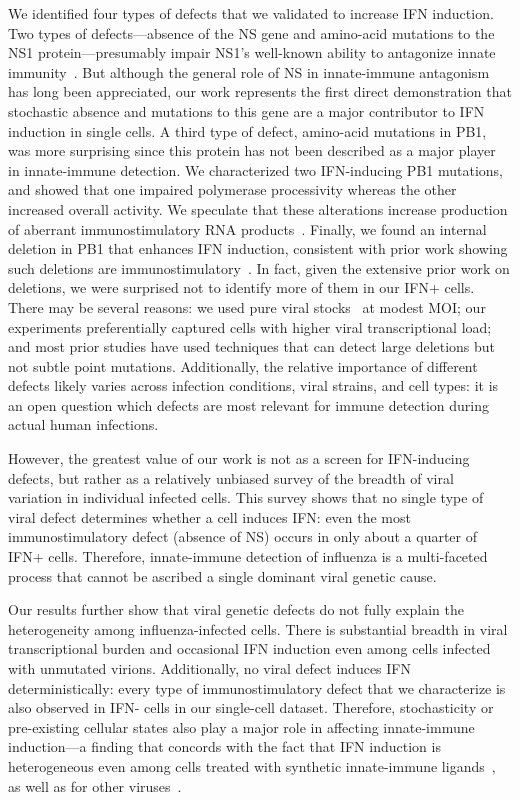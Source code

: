 \documentclass[]{asm-article}
\begin{document}
We identified four types of defects that we validated to increase IFN induction. 
Two types of defects---absence of the NS gene and amino-acid mutations to the NS1 protein---presumably impair NS1's well-known ability to antagonize innate immunity~\cite{garcia1998influenza, hale2008multifunctional}.
But although the general role of NS in innate-immune antagonism has long been appreciated, our work represents the first direct demonstration that stochastic absence and mutations to this gene are a major contributor to IFN induction in single cells.
A third type of defect, amino-acid mutations in PB1, was more surprising since this protein has not been described as a major player in innate-immune detection.
We characterized two IFN-inducing PB1 mutations, and showed that one impaired polymerase processivity whereas the other increased overall activity.
We speculate that these alterations increase production of aberrant immunostimulatory RNA products~\cite{velthuis2018mini}.
Finally, we found an internal deletion in PB1 that enhances IFN induction, consistent with prior work showing such deletions are immunostimulatory~\cite{baum2010preference, tapia2013defective, boergeling2015evidence, dimmock2015cloned, liu2019inhibition}.
In fact, given the extensive prior work on deletions, we were surprised not to identify more of them in our IFN+ cells.
There may be several reasons: we used pure viral stocks~\cite{xue2016propagation} at modest MOI; our experiments preferentially captured cells with higher viral transcriptional load; and most prior studies have used techniques that can detect large deletions but not subtle point mutations.
Additionally, the relative importance of different defects likely varies across infection conditions, viral strains, and cell types: it is an open question which defects are most relevant for immune detection during actual human infections.

However, the greatest value of our work is not as a screen for IFN-inducing defects, but rather as a relatively unbiased survey of the breadth of viral variation in individual infected cells.
This survey shows that no single type of viral defect determines whether a cell induces IFN: even the most immunostimulatory defect (absence of NS) occurs in only about a quarter of IFN+ cells.
Therefore, innate-immune detection of influenza is a multi-faceted process that cannot be ascribed a single dominant viral genetic cause.   

Our results further show that viral genetic defects do not fully explain the heterogeneity among influenza-infected cells.
There is substantial breadth in viral transcriptional burden and occasional IFN induction even among cells infected with unmutated virions.
Additionally, no viral defect induces IFN deterministically: every type of immunostimulatory defect that we characterize is also observed in IFN- cells in our single-cell dataset.
Therefore, stochasticity or pre-existing cellular states also play a major role in affecting innate-immune induction---a finding that concords with the fact that IFN induction is heterogeneous even among cells treated with synthetic innate-immune ligands~\cite{shalek2013single, shalek2014single, wimmers2018single, bhushal2017cell}, as well as for other viruses~\cite{oneal2018west}.
\end{document}
